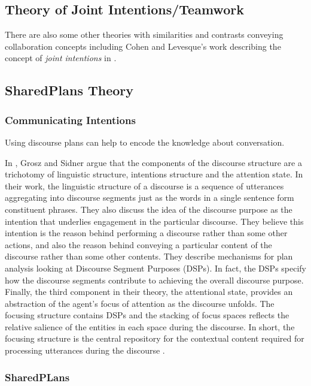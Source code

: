 \documentclass[11pt]{article}
\begin{document}
\subsection{Theory of Joint Intentions/Teamwork}

There are also some other theories with similarities and contrasts conveying
collaboration concepts including Cohen and Levesque's work describing the
concept of \textit{joint intentions} in \cite{cohen:teamwork,
levesque:acting-together}.

\subsection{SharedPlans Theory}
\label{sec:sharedplans}

\subsubsection{Communicating Intentions}

Using discourse plans can help to encode the knowledge about conversation.

In \cite{grosz:plans-discourse}, Grosz and Sidner argue that the components of
the discourse structure are a trichotomy of linguistic structure, intentions
structure and the attention state. In their work, the linguistic structure of a
discourse is a sequence of utterances aggregating into discourse segments just
as the words in a single sentence form constituent phrases. They also discuss
the idea of the discourse purpose as the intention that underlies engagement in
the particular discourse. They believe this intention is the reason behind
performing a discourse rather than some other actions, and also the reason
behind conveying a particular content of the discourse rather than some other
contents. They describe mechanisms for plan analysis looking at Discourse
Segment Purposes (DSPs). In fact, the DSPs specify how the discourse segments
contribute to achieving the overall discourse purpose. Finally, the third
component in their theory, the attentional state, provides an abstraction of the
agent's focus of attention as the discourse unfolds. The focusing structure
contains DSPs and the stacking of focus spaces reflects the relative salience of
the entities in each space during the discourse. In short, the focusing
structure is the central repository for the contextual content required for
processing utterances during the discourse \cite{grosz:plans-discourse}.

\subsubsection{SharedPLans}
\end{document}
